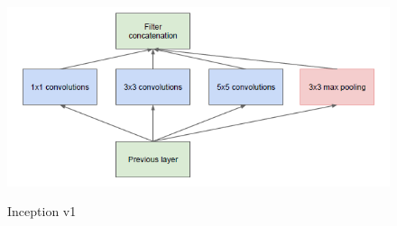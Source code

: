 \begin{figure}[h]
  \centering
  \includegraphics[width=13cm, height=6cm]{Img/inception-v1.png}
  \caption{Inception v1}
  \label{fig:inception-v1}
\end{figure}
